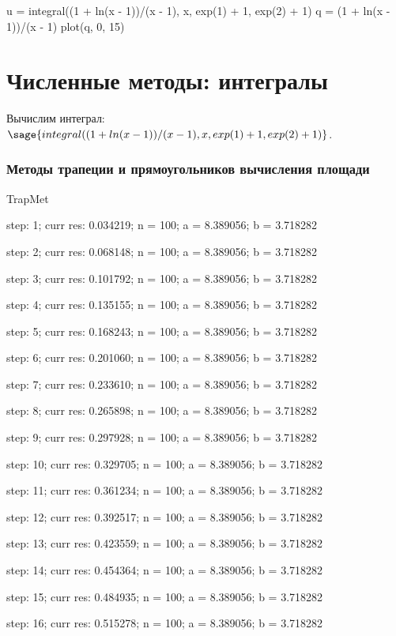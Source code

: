 \documentclass[14pt]{extreport}
\begin{document}
\begin{sagesilent}
u = integral((1 + ln(x - 1))/(x - 1), x, exp(1) + 1, exp(2) + 1)
q = (1 + ln(x - 1))/(x - 1)
plot(q, 0, 15)
\end{sagesilent}

\section{Численные методы: интегралы}


Вычислим интеграл: $\sage{integral((1 + ln(x - 1))/(x - 1), x, exp(1) + 1, exp(2) + 1)}$.

\subsubsection{Методы трапеции и прямоугольников вычисления площади}
TrapMet

step: 1; curr res: 0.034219; n = 100; a = 8.389056; b = 3.718282

step: 2; curr res: 0.068148; n = 100; a = 8.389056; b = 3.718282

step: 3; curr res: 0.101792; n = 100; a = 8.389056; b = 3.718282

step: 4; curr res: 0.135155; n = 100; a = 8.389056; b = 3.718282

step: 5; curr res: 0.168243; n = 100; a = 8.389056; b = 3.718282

step: 6; curr res: 0.201060; n = 100; a = 8.389056; b = 3.718282

step: 7; curr res: 0.233610; n = 100; a = 8.389056; b = 3.718282

step: 8; curr res: 0.265898; n = 100; a = 8.389056; b = 3.718282

step: 9; curr res: 0.297928; n = 100; a = 8.389056; b = 3.718282

step: 10; curr res: 0.329705; n = 100; a = 8.389056; b = 3.718282

step: 11; curr res: 0.361234; n = 100; a = 8.389056; b = 3.718282

step: 12; curr res: 0.392517; n = 100; a = 8.389056; b = 3.718282

step: 13; curr res: 0.423559; n = 100; a = 8.389056; b = 3.718282

step: 14; curr res: 0.454364; n = 100; a = 8.389056; b = 3.718282

step: 15; curr res: 0.484935; n = 100; a = 8.389056; b = 3.718282

step: 16; curr res: 0.515278; n = 100; a = 8.389056; b = 3.718282
\end{document}
